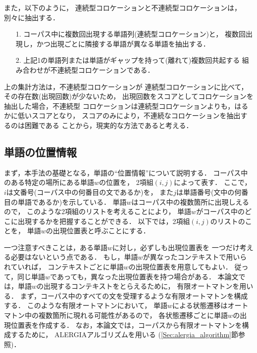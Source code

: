 また，以下のように，
連続型コロケーションと不連続型コロケーションは，別々に抽出する．
\begin{itemize}
\item[1.] コーパス中に複数回出現する単語列(連続型コロケーション)と，
複数回出現し，かつ出現ごとに隣接する単語が異なる単語を抽出する．
\item[2.] 上記1の単語列または単語がギャップを持って(離れて)複数回共起する
組み合わせが不連続型コロケーションである．
\end{itemize}
上の集計方法は，不連続型コロケーションが
連続型コロケーションに比べて，その存在数(出現回数)が少ないため，
出現回数をスコアとしてコロケーションを抽出した場合，不連続型
コロケーションは連続型コロケーションよりも，はるかに低いスコアとなり，
スコアのみにより，不連続なコロケーションを抽出するのは困難である
\cite{Omoto96}ことから，現実的な方法であると考える．

\subsection{単語の位置情報}
\label{Subsec:based}

まず，本手法の基礎となる，単語の``位置情報''について説明する．
コーパス中のある特定の場所にある単語$w$の位置を，
2項組\hspace{-0.2mm}$(i,j)$\hspace{-0.2mm}によって表す．
ここで，$i$は文番号(コーパス中の何番目の文であるか)を，
また$j$は単語番号(文中の何番目の単語であるか)を示している．
単語$w$はコーパス中の複数箇所に出現しえるので，
このような2項組のリストを考えることにより，
単語$w$がコーパス中のどこに出現するかを把握することができる．
以下では，2項組\hspace{-0.2mm}$(i,j)$\hspace{-0.2mm}のリストのことを，
単語$w$の出現位置表と呼ぶことにする．

一つ注意すべきことは，ある単語\hspace{-0.2mm}$w$\hspace{-0.2mm}に対し，必ずしも出現位置表を
一つだけ考える必要はないという点である．
もし，単語$w$が異なったコンテキストで用いられていれば，
コンテキストごとに単語$w$の出現位置表を用意してもよい．
従って，同じ単語$w$であっても，異なった出現位置表を持つ場合がある．
本論文では，単語$w$の出現するコンテキストをとらえるために，
有限オートマトンを用いる．
まず，コーパス中のすべての文を受理するような有限オートマトンを構成する．
このような有限オートマトンにおいて，
単語$w$による状態遷移はオートマトン中の複数箇所に現れる可能性があるので，
各状態遷移ごとに単語$w$の出現位置表を作成する．
なお，本論文では，コーパスから有限オートマトンを構成するために，
ALERGIAアルゴリズム\cite{Carrasco94}を用いる
(\ref{Sec:alergia_algorithm}節参照)．

